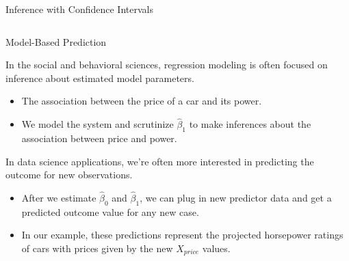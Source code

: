 \documentclass[10pt]{beamer}\usepackage[]{graphicx}\usepackage[]{color}
\newenvironment{knitrout}{}{} %
\begin{document}
{\begin{frame}{Inference with Confidence Intervals}
\begin{columns}
\begin{column}{0.5\textwidth}
\begin{knitrout}
{}


\end{knitrout}

\end{column}
\end{columns}

\end{frame}
}%


\begin{frame}{Model-Based Prediction}

  In the social and behavioral sciences, regression modeling is often focused on
  inference about estimated model parameters.
  \vc
  \begin{itemize}
  \item The association between the price of a car and its power.
    \vc
  \item We model the system and scrutinize $\hat{\beta}_1$ to make inferences
    about the association between price and power.
  \end{itemize}
  \vb
  \pause
  In data science applications, we're often more interested in predicting the
  outcome for new observations.
  \vc
  \begin{itemize}
  \item After we estimate $\hat{\beta}_0$ and $\hat{\beta}_1$, we can plug in
    new predictor data and get a predicted outcome value for any new case.
  \vc
  \item In our example, these predictions represent the projected horsepower
    ratings of cars with prices given by the new $X_{price}$ values.
  \end{itemize}

\end{frame}

\end{document}
